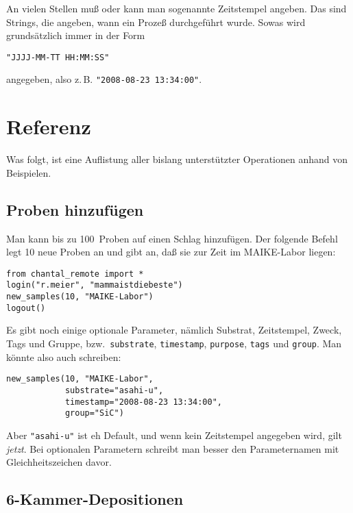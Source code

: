 \documentclass[german,11pt]{article}
\begin{document}
An vielen Stellen muß oder kann man sogenannte Zeitstempel angeben.  Das sind
Strings, die angeben, wann ein Prozeß durchgeführt wurde.  Sowas wird
grundsätzlich immer in der Form
\begin{lstlisting}
"JJJJ-MM-TT HH:MM:SS"
\end{lstlisting}
angegeben, also z.\,B. \lstinline{"2008-08-23 13:34:00"}.

\section{Referenz}

Was folgt, ist eine Auflistung aller bislang unterstützter Operationen anhand
von Beispielen.

\subsection{Proben hinzufügen}

Man kann bis zu 100~Proben auf einen Schlag hinzufügen.  Der folgende Befehl
legt 10 neue Proben an und gibt an, daß sie zur Zeit im MAIKE-Labor liegen:
\begin{lstlisting}
from chantal_remote import *
login("r.meier", "mammaistdiebeste")
new_samples(10, "MAIKE-Labor")
logout()
\end{lstlisting}
Es gibt noch einige optionale Parameter, nämlich Substrat, Zeitstempel, Zweck,
Tags und Gruppe, bzw.\ \lstinline{substrate}, \lstinline{timestamp},
\lstinline{purpose}, \lstinline{tags} und \lstinline{group}.  Man könnte also
auch schreiben:
\begin{lstlisting}
new_samples(10, "MAIKE-Labor",
            substrate="asahi-u",
            timestamp="2008-08-23 13:34:00",
            group="SiC")
\end{lstlisting}
Aber \lstinline{"asahi-u"} ist eh Default, und wenn kein Zeitstempel angegeben
wird, gilt \emph{jetzt}.  Bei optionalen Parametern schreibt man besser den
Parameternamen mit Gleichheitszeichen davor.


\subsection{6-Kammer-Depositionen}
\end{document}
